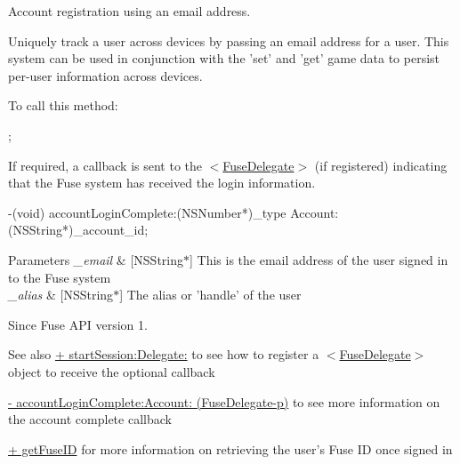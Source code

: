 Account registration using an email address. 

Uniquely track a user across devices by passing an email address for a user. This system can be used in conjunction with the 'set' and 'get' game data to persist per-\/user information across devices.

To call this method\+:


\begin{DoxyCode}
;
\end{DoxyCode}


If required, a callback is sent to the $<$\hyperlink{protocol_fuse_delegate-p}{Fuse\+Delegate}$>$ (if registered) indicating that the Fuse system has received the login information.


\begin{DoxyCode}
-(void) accountLoginComplete:(NSNumber*)\_type Account:(NSString*)\_account\_id;
\end{DoxyCode}



\begin{DoxyParams}{Parameters}
{\em \+\_\+email} & \mbox{[}N\+S\+String$\ast$\mbox{]} This is the email address of the user signed in to the Fuse system \\
\hline
{\em \+\_\+alias} & \mbox{[}N\+S\+String$\ast$\mbox{]} The alias or 'handle' of the user \\
\hline
\end{DoxyParams}
\begin{DoxySince}{Since}
Fuse A\+P\+I version 1. 
\end{DoxySince}
\begin{DoxySeeAlso}{See also}
\hyperlink{interface_fuse_a_p_i_aab1649c81002a336ca872da6fef36b8d}{+ start\+Session\+:\+Delegate\+:} to see how to register a $<$\hyperlink{protocol_fuse_delegate-p}{Fuse\+Delegate}$>$ object to receive the optional callback 

\hyperlink{protocol_fuse_delegate-p_a54a18530604a7ceeb0e9419fc7fa3345}{-\/ account\+Login\+Complete\+:\+Account\+: (\+Fuse\+Delegate-\/p)} to see more information on the account complete callback 

\hyperlink{interface_fuse_a_p_i_ab483c2a3f4439aad8e19200cf24ff731}{+ get\+Fuse\+I\+D} for more information on retrieving the user's Fuse I\+D once signed in 
\end{DoxySeeAlso}
\hypertarget{interface_fuse_a_p_i_a8c0d55b6f8fad28e9cb150271a82df2f}{}
